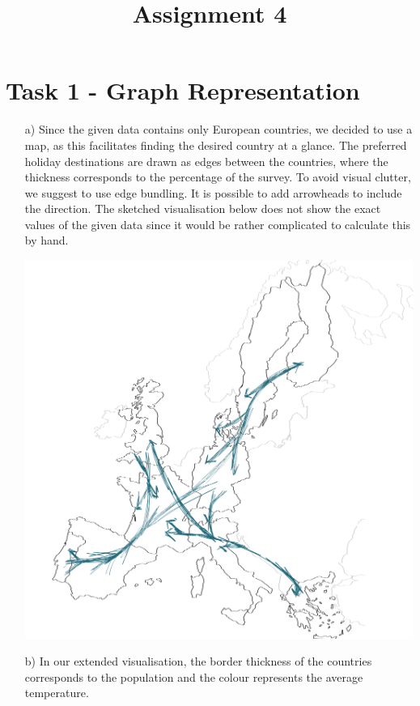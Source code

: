 \documentclass[a4paper]{article}
\date{}
\author{}
\title{\textbf{Assignment 4}}
\begin{document}
\maketitle 
\thispagestyle{fancy}

\section*{Task 1 - Graph Representation}
\begin{enumerate}
	\item[a)]
	Since the given data contains only European countries, we decided to use a map, as this facilitates finding the desired country at a glance. 
	The preferred holiday destinations are drawn as edges between the countries, where the thickness corresponds to the percentage of the survey. 
	To avoid visual clutter, we suggest to use edge bundling. 
	It is possible to add arrowheads to include the direction. 
	The sketched visualisation below does not show the exact values of the given data since it would be rather complicated to calculate this by hand. 
	
	\includegraphics[width=\linewidth]{task1_a.pdf}
	\newpage
	\item[b)]
	In our extended visualisation, the border thickness of the countries corresponds to the population and the colour represents the average temperature. 
	

\end{enumerate}
\end{document}
